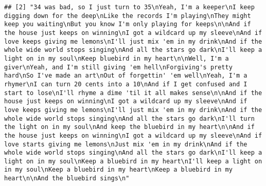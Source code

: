 \documentclass[]{article}
\begin{document}
\begin{verbatim}
## [2] "34 was bad, so I just turn to 35\nYeah, I'm a keeper\nI keep digging down for the deep\nLike the records I'm playing\nThey might keep you waiting\nBut you know I'm only playing for keeps\n\nAnd if the house just keeps on winning\nI got a wildcard up my sleeve\nAnd if love keeps giving me lemons\nI'll just mix 'em in my drink\nAnd if the whole wide world stops singing\nAnd all the stars go dark\nI'll keep a light on in my soul\nKeep bluebird in my heart\n\nWell, I'm a giver\nYeah, and I'm still giving 'em hell\nForgiving's pretty hard\nSo I've made an art\nOut of forgettin' 'em well\nYeah, I'm a rhymer\nI can turn 20 cents into a 10\nAnd if I get confused and I start to lose\nI'll rhyme a dime 'til it all makes sense\n\nAnd if the house just keeps on winning\nI got a wildcard up my sleeve\nAnd if love keeps giving me lemons\nI'll just mix 'em in my drink\nAnd if the whole wide world stops singing\nAnd all the stars go dark\nI'll turn the light on in my soul\nAnd keep the bluebird in my heart\n\nAnd if the house just keeps on winning\nI got a wildcard up my sleeve\nAnd if love starts giving me lemons\nJust mix 'em in my drink\nAnd if the whole wide world stops singing\nAnd all the stars go dark\nI'll keep a light on in my soul\nKeep a bluebird in my heart\nI'll keep a light on in my soul\nKeep a bluebird in my heart\nKeep a bluebird in my heart\n\nAnd the bluebird sings\n"                                                                                                                                                                                                                                                                                                                                                                     

\end{verbatim}
\end{document}
